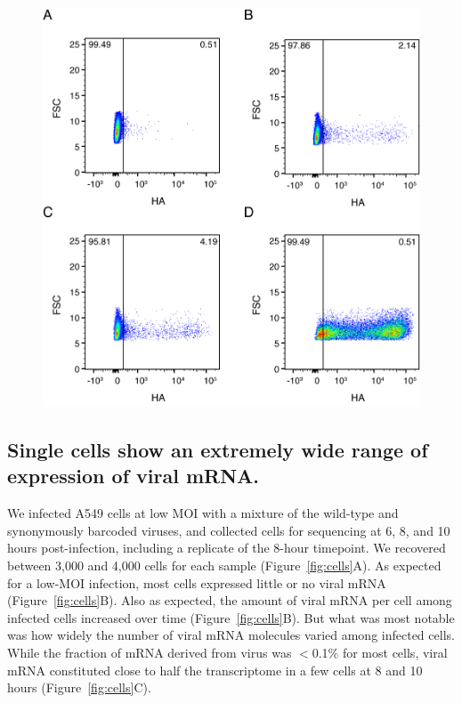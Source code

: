 \documentclass[9pt,lineno]{elife}
\begin{document}
\begin{figure}
{}{\includegraphics[width=0.7\linewidth]{figures/Validating_barcode_virus/HA_stain_supplement.png}}\end{figure}

\subsection{Single cells show an extremely wide range of expression of viral mRNA.}
We infected A549 cells at low MOI with a mixture of the wild-type and synonymously barcoded viruses, and collected cells for sequencing at 6, 8, and 10 hours post-infection, including a replicate of the 8-hour timepoint.
We recovered between 3,000 and 4,000 cells for each sample (Figure~\ref{fig:cells}A). 
As expected for a low-MOI infection, most cells expressed little or no viral mRNA (Figure~\ref{fig:cells}B).
Also as expected, the amount of viral mRNA per cell among infected cells increased over time (Figure~\ref{fig:cells}B).
But what was most notable was how widely the number of viral mRNA molecules varied among infected cells.
While the fraction of mRNA derived from virus was $<$0.1\% for most cells, viral mRNA constituted close to half the transcriptome in a few cells at 8 and 10 hours (Figure~\ref{fig:cells}C).
\end{document}
